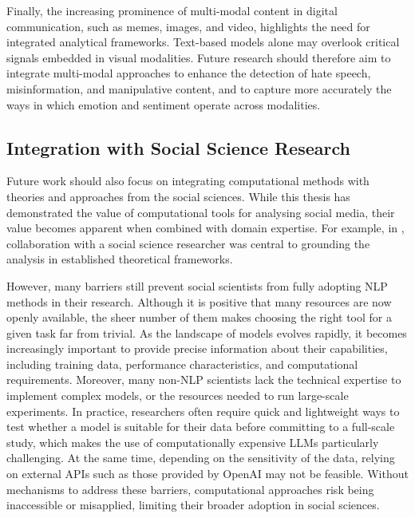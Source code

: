 Finally, the increasing prominence of multi-modal content in digital communication, such as memes, images, and video, highlights the need for integrated analytical frameworks. Text-based models alone may overlook critical signals embedded in visual modalities. Future research should therefore aim to integrate multi-modal approaches to enhance the detection of hate speech, misinformation, and manipulative content, and to capture more accurately the ways in which emotion and sentiment operate across modalities.


\subsection{Integration with Social Science Research}
Future work should also focus on integrating computational methods with theories and approaches from the social sciences. While this thesis has demonstrated the value of computational tools for analysing social media, their value becomes apparent when combined with domain expertise. For example, in , collaboration with a social science researcher was central to grounding the analysis in established theoretical frameworks.

However, many barriers still prevent social scientists from fully adopting \ac{NLP} methods in their research. Although it is positive that many resources are now openly available, the sheer number of them makes choosing the right tool for a given task far from trivial. As the landscape of models evolves rapidly, it becomes increasingly important to provide precise information about their capabilities, including training data, performance characteristics, and computational requirements. Moreover, many non-\ac{NLP} scientists lack the technical expertise to implement complex models, or the resources needed to run large-scale experiments. In practice, researchers often require quick and lightweight ways to test whether a model is suitable for their data before committing to a full-scale study, which makes the use of computationally expensive \acp{LLM} particularly challenging. At the same time, depending on the sensitivity of the data, relying on external \acp{API} such as those provided by OpenAI may not be feasible. Without mechanisms to address these barriers, computational approaches risk being inaccessible or misapplied, limiting their broader adoption in social sciences.

